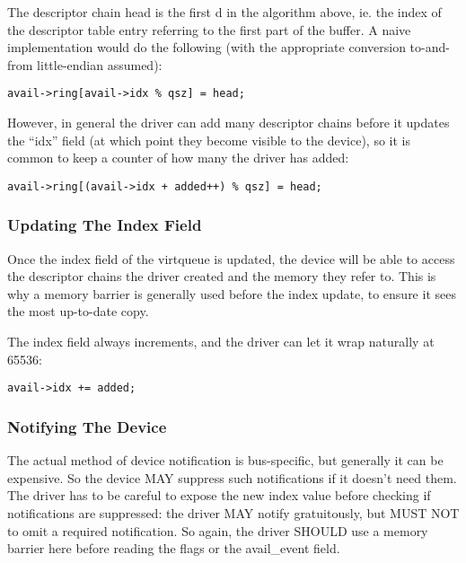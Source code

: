 The descriptor chain head is the first d in the algorithm
above, ie. the index of the descriptor table entry referring to the first
part of the buffer.  A naive implementation would do the following (with the
appropriate conversion to-and-from little-endian assumed):

\begin{lstlisting}
avail->ring[avail->idx % qsz] = head;
\end{lstlisting}

However, in general the driver can add many descriptor chains before it updates
the “idx” field (at which point they become visible to the
device), so it is common to keep a counter of how many the driver has added:

\begin{lstlisting}
avail->ring[(avail->idx + added++) % qsz] = head;
\end{lstlisting}

\subsubsection{Updating The Index Field}\label{sec:General Initialization And Device Operation / Device Operation / Supplying Buffers to The Device / Updating The Index Field}

Once the index field of the virtqueue is updated, the device will
be able to access the descriptor chains the driver created and the
memory they refer to. This is why a memory barrier is generally
used before the index update, to ensure it sees the most up-to-date
copy.

The index field always increments, and the driver can let it wrap naturally at
65536:

\begin{lstlisting}
avail->idx += added;
\end{lstlisting}

\subsubsection{Notifying The Device}\label{sec:General Initialization And Device Operation / Device Operation / Supplying Buffers to The Device / Notifying The Device}

The actual method of device notification is bus-specific, but generally
it can be expensive.  So the device MAY suppress such notifications if it
doesn't need them.  The driver has to be careful to expose the new index
value before checking if notifications are suppressed: the driver MAY notify
gratuitously, but MUST NOT to omit a required notification. So again,
the driver SHOULD use a memory barrier here before reading the flags or the
avail_event field.

